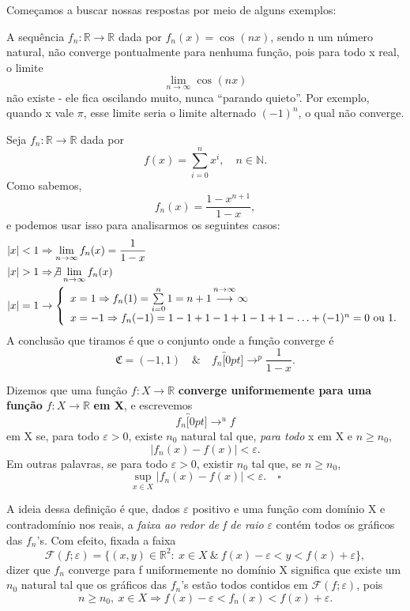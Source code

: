 \documentclass[../analysisII_notes.tex]{subfiles}
\begin{document}
Começamos a buscar nossas respostas por meio de alguns exemplos:
\begin{example}
	A sequência \(f_{n}:\mathbb{R}\rightarrow \mathbb{R}\) dada por \(f_{n}(x)=\cos^{}{(nx)}\), sendo n um número natural, não converge pontualmente para nenhuma função, pois para todo x real, o limite
	\[
		\lim_{n\to \infty}\cos^{}{(nx)}
	\]
	não existe - ele fica oscilando muito, nunca ``parando quieto''. Por exemplo, quando x vale \(\pi \), esse limite seria o limite alternado \((-1)^{n}\), o qual não converge.
\end{example}
\begin{example}
	Seja \(f_{n}:\mathbb{R}\rightarrow \mathbb{R}\) dada por
	\[
		f(x)=\sum\limits_{i=0}^{n}x^{i},\quad n\in \mathbb{N}.
	\]
	Como sabemos,
	\[
		f_{n}(x)=\frac{1-x^{n+1}}{1-x},
	\]
	e podemos usar isso para analisarmos os seguintes casos:
	\begin{align*}
		 & |x|<1 \Rightarrow \lim_{n\to \infty}f_{n}(x)=\frac{1}{1-x}                                                                            \\
		 & |x|>1 \Rightarrow \not\exists \lim_{n\to \infty}f_{n}(x)                                                                              \\
		 & |x|=1 \rightarrow \left\{\begin{array}{ll}
			                            x = 1 \Rightarrow f_{n}(1)=\sum\limits_{i=0}^{n}1=n+1 \overbracket[0pt]{\longrightarrow}^{n\to \infty}\infty \\
			                            x= -1 \Rightarrow f_{n}(-1)=1-1+1-1+1-1+1-\dotsc + (-1)^{n}=0 \text{ ou }1.
		                            \end{array}\right.
	\end{align*}
	A conclusão que tiramos é que o conjunto onde a função converge é
	\[
		\mathfrak{C}=(-1, 1) \quad\&\quad f_{n}\overbracket[0pt]{\longrightarrow}^{p}\frac{1}{1-x}.
	\]
\end{example}
\begin{def*}
	Dizemos que uma função \(f:X\rightarrow \mathbb{R}\) \textbf{converge uniformemente para uma função }\(f:X\rightarrow \mathbb{R}\)\textbf{ em X}, e escrevemos
	\[
		f_{n}\overbracket[0pt]{\rightarrow}^{u}f
	\]
	em X se, para todo \(\varepsilon >0\), existe \(n_{0}\) natural tal que, \textit{para todo} x em X e \(n\geq n_{0}\),
	\[
		|f_{n}(x)-f(x)|<\varepsilon .
	\]
	Em outras palavras, se para todo \(\varepsilon > 0\), existir \(n_{0}\) tal que, se \(n\geq n_{0}\),
	\[
		\sup_{x\in X}|f_{n}(x)-f(x)|<\varepsilon .\quad \square
	\]
\end{def*}
A ideia dessa definição é que, dados \(\varepsilon \) positivo e uma função com domínio X e contradomínio nos reais, a \textit{faixa ao redor de f de raio }\(\varepsilon \) contém todos os gráficos das \(f_{n}\)'s. Com efeito, fixada a faixa
\[
	\mathcal{F}(f;\varepsilon )=\{(x, y)\in \mathbb{R}^{2}:\: x\in X \:\&\:f(x)-\varepsilon <y<f(x)+\varepsilon \},
\]
dizer que \(f_{n}\) converge para f uniformemente no domínio X significa que existe um \(n_{0}\) natural tal que os gráficos das \(f_{n}\)'s estão todos contidos em \(\mathcal{F}(f;\varepsilon )\), pois
\[
	n\geq n_{0},\: x\in X \Rightarrow f(x)-\varepsilon  < f_{n}(x)<f(x)+\varepsilon .
\]
\end{document}
